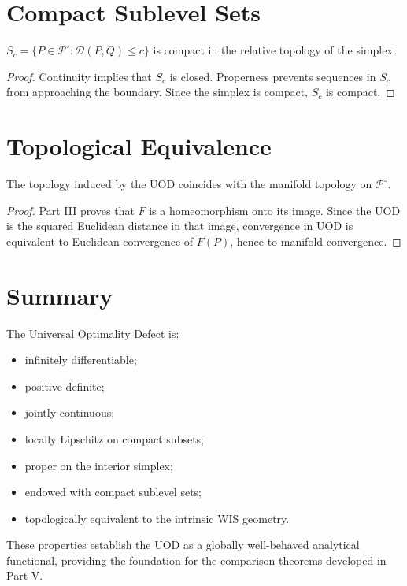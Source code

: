 \section{Compact Sublevel Sets}
\begin{corollary}
\label{ch:cor:23-7}
$S_c=\{P\in\mathcal P^\circ:\mathcal D(P,Q)\le c\}$
is compact in the relative topology of the simplex.
\end{corollary}
\begin{proof} Continuity implies that \(S_c\) is closed. Properness prevents
sequences in \(S_c\) from approaching the boundary. Since the simplex is
compact, \(S_c\) is compact. 
\end{proof}
\section{Topological Equivalence}
\begin{theorem}
\label{ch:thm:23-8}
The topology induced by the UOD coincides with the manifold topology on
\(\mathcal P^\circ\).
\end{theorem}
\begin{proof} Part III proves that \(F\) is a homeomorphism onto its image.
Since the UOD is the squared Euclidean distance in that image,
convergence in UOD is equivalent to Euclidean convergence of \(F(P)\),
hence to manifold convergence. 
\end{proof}
\section{Summary}
The Universal Optimality Defect is:
\begin{itemize}
\item infinitely differentiable;
\item positive definite;
\item jointly continuous;
\item locally Lipschitz on compact subsets;
\item proper on the interior simplex;
\item endowed with compact sublevel sets;
\item topologically equivalent to the intrinsic WIS geometry.
\end{itemize}
These properties establish the UOD as a globally well-behaved analytical
functional, providing the foundation for the comparison theorems
developed in Part V.
